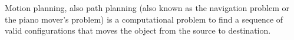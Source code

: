 \documentclass[a4paper]{article}
\title{}
\date{}
\begin{document}
    \maketitle
    Motion planning, also path planning (also known as the navigation problem or the piano mover's problem) is a computational problem to find a sequence of valid configurations that moves the object from the source to destination.
\end{document}
